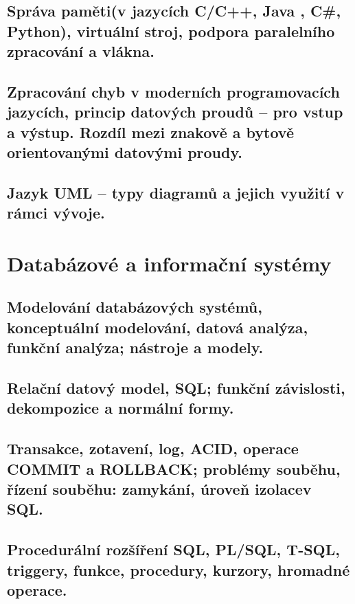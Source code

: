 \documentclass{book}
\begin{document}
\chapter{Správa paměti(v jazycích C/C++, Java , C\#, Python), virtuální stroj, podpora paralelního zpracování a vlákna.}

\clearpage

\chapter{Zpracování chyb v moderních programovacích jazycích, princip datových proudů – pro vstup a výstup. Rozdíl mezi znakově a bytově orientovanými datovými proudy.}

\clearpage

\chapter{Jazyk UML – typy diagramů a jejich využití v rámci vývoje.}

\clearpage

\part{Databázové a informační systémy}

\chapter{Modelování databázových systémů, konceptuální modelování, datová analýza, funkční analýza; nástroje a modely. }

\clearpage

\chapter{Relační datový model, SQL; funkční závislosti, dekompozice a normální formy.}

\clearpage

\chapter{Transakce, zotavení, log, ACID, operace COMMIT a ROLLBACK; problémy souběhu, řízení souběhu: zamykání, úroveň izolacev SQL.}

\clearpage

\chapter{Procedurální rozšíření SQL, PL/SQL, T-SQL, triggery, funkce, procedury, kurzory, hromadné operace.}

\clearpage
\end{document}
